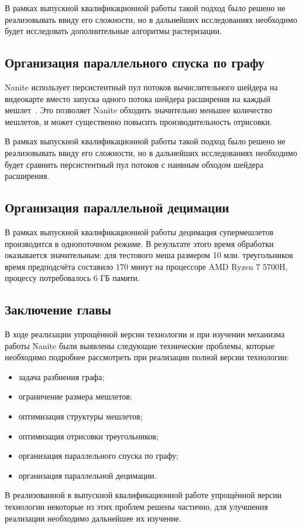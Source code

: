 В рамках выпускной квалификационной работы такой подход было решено не реализовывать ввиду его сложности, но в дальнейших исследованиях необходимо будет исследовать дополнительные алгоритмы растеризации.

\subsection*{Организация параллельного спуска по графу}
Nanite использует персистентный пул потоков вычислительного шейдера на видеокарте вместо запуска одного потока шейдера расширения на каждый мешлет~\cite{KarisNanite}.
Это позволяет Nanite обходить значительно меньшее количество мешлетов, и может существенно повысить производительность отрисовки.

В рамках выпускной квалификационной работы такой подход было решено не реализовывать ввиду его сложности, но в дальнейших исследованиях необходимо будет сравнить персистентный пул потоков с наивным обходом шейдера расширения.

\subsection*{Организация параллельной децимации}
В рамках выпускной квалификационной работы децимация супермешлетов производится в однопоточном режиме.
В результате этого время обработки оказывается значительным: для тестового меша размером 10 млн. треугольников время предподсчёта составило 170 минут на процессоре AMD Ryzen 7 5700H, процессу потребовалось 6 ГБ памяти.

\subsection*{Заключение главы}
В ходе реализации упрощённой версии технологии и при изучении механизма работы Nanite были выявлены следующие технические проблемы, которые необходимо подробнее рассмотреть при реализации полной версии технологии:
\begin{itemize}
    \item задача разбиения графа;
    \item ограничение размера мешлетов;
    \item оптимизация структуры мешлетов;
    \item оптимизация отрисовки треугольников;
    \item организация параллельного спуска по графу;
    \item организация параллельной децимации.
\end{itemize}

В реализованной в выпускной квалификационной работе упрощённой версии технологии некоторые из этих проблем решены частично, для улучшения реализации необходимо дальнейшее их изучение.
